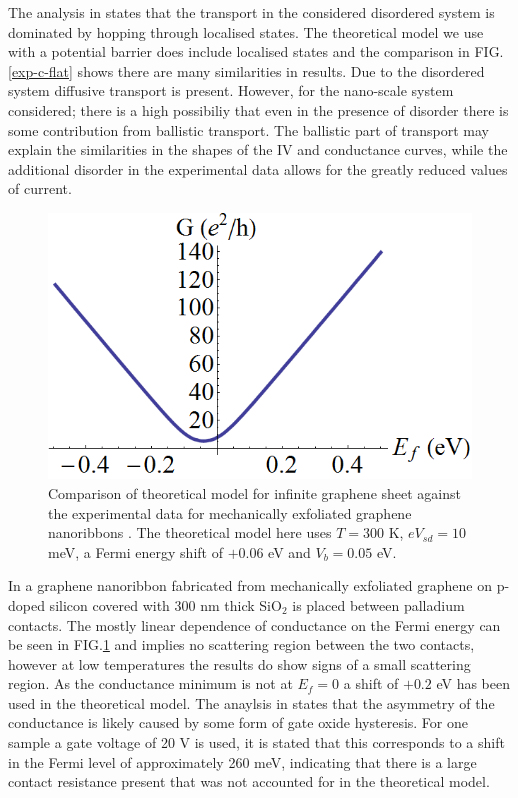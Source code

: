 \documentclass[prl,twocolumn,aps,superscriptaddress,floatfix,10pt]{revtex4}
\begin{document}
	The analysis in \cite{b12} states that the transport in the considered disordered system is dominated by hopping through localised states. The theoretical model we use with a potential barrier does include localised states and the comparison in FIG.\ref{exp-c-flat} shows there are many similarities in results. Due to the disordered system diffusive transport is present. However, for the nano-scale system considered; there is a high possibiliy that even in the presence of disorder there is some contribution from ballistic transport. The ballistic part of transport may explain the similarities in the shapes of the IV and conductance curves, while the additional disorder in the experimental data allows for the greatly reduced values of current.
\begin{figure}
	\includegraphics[scale=0.2]{exp-d-flat}
	\caption{Comparison of theoretical model for infinite graphene sheet against the experimental data for mechanically exfoliated graphene nanoribbons \cite{b13}. The theoretical model here uses $T=300$ K, $eV_{sd}=10$ meV, a Fermi energy shift of $+0.06$ eV and $V_{b}=0.05$ eV.}
	\label{exp-d-flat}
\end{figure}

	In \cite{b13} a graphene nanoribbon fabricated from mechanically exfoliated graphene on p-doped silicon covered with 300 nm thick SiO$_{2}$ is placed between palladium contacts. The mostly linear dependence of conductance on the Fermi energy can be seen in FIG.\ref{exp-d-flat} and implies no scattering region between the two contacts, however at low temperatures the results do show signs of a small scattering region. As the conductance minimum is not at $E_{f}=0$ a shift of $+0.2$ eV has been used in the theoretical model. The anaylsis in \cite{b13} states that the asymmetry of the conductance is likely caused by some form of gate oxide hysteresis. For one sample a gate voltage of 20 V is used, it is stated that this corresponds to a shift in the Fermi level of approximately 260 meV, indicating that there is a large contact resistance present that was not accounted for in the theoretical model.
\end{document}
